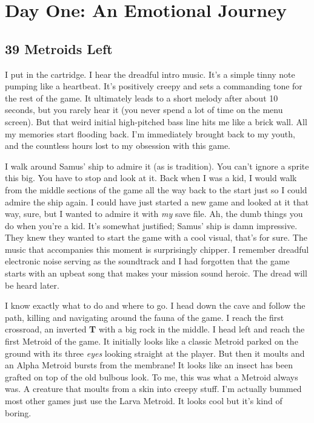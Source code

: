 \documentclass{book}
\begin{document}
\FloatBarrier\needspace{10mm}\section*{Day One: An Emotional Journey}\nopagebreak[4]

\subsection*{39 Metroids Left}\nopagebreak[4]

I put in the cartridge. I hear the dreadful intro music. It’s a simple tinny note pumping like a heartbeat. It’s positively creepy and sets a commanding tone for the rest of the game. It ultimately leads to a short melody after about 10 seconds, but you rarely hear it (you never spend a lot of time on the menu screen). But that weird initial high-pitched bass line hits me like a brick wall. All my memories start flooding back. I’m immediately brought back to my youth, and the countless hours lost to my obsession with this game.

I walk around Samus’ ship to admire it (as is tradition). You can’t ignore a sprite this big. You have to stop and look at it. Back when I was a kid, I would walk from the middle sections of the game all the way back to the start just so I could admire the ship again. I could have just started a new game and looked at it that way, sure, but I wanted to admire it with \emph{my} save file. Ah, the dumb things you do when you’re a kid. It’s somewhat justified; Samus’ ship is damn impressive. They knew they wanted to start the game with a cool visual, that’s for sure. The music that accompanies this moment is surprisingly chipper. I remember dreadful electronic noise serving as the soundtrack and I had forgotten that the game starts with an upbeat song that makes your mission sound heroic. The dread will be heard later.

I know exactly what to do and where to go. I head down the cave and follow the path, killing and navigating around the fauna of the game. I reach the first crossroad, an inverted \textbf{T} with a big rock in the middle. I head left and reach the first Metroid of the game. It initially looks like a classic Metroid parked on the ground with its three \emph{eyes} looking straight at the player. But then it moults and an Alpha Metroid bursts from the membrane! It looks like an insect has been grafted on top of the old bulbous look. To me, this was what a Metroid always was. A creature that moults from a skin into creepy stuff. I’m actually bummed most other games just use the Larva Metroid. It looks cool but it’s kind of boring.
\end{document}
